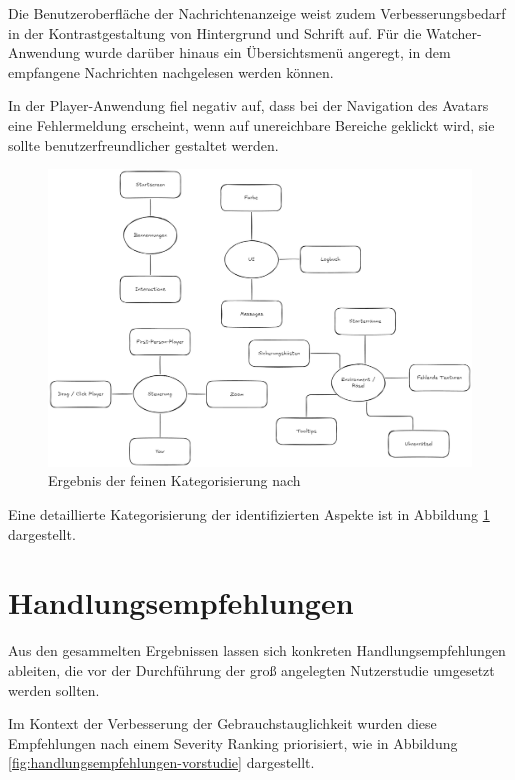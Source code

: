 Die Benutzeroberfläche der Nachrichtenanzeige weist zudem Verbesserungsbedarf in der Kontrastgestaltung von Hintergrund und Schrift auf. Für die Watcher-Anwendung wurde darüber hinaus ein Übersichtsmenü angeregt, in dem empfangene Nachrichten nachgelesen werden können.

In der Player-Anwendung fiel negativ auf, dass bei der Navigation des Avatars eine Fehlermeldung erscheint, wenn auf unereichbare Bereiche geklickt wird, sie sollte benutzerfreundlicher gestaltet werden.

\begin{figure}[ht]
\centering
\includegraphics[width=1\linewidth]{content/pictures/Prestudy-Qualitative-Auswertung-Schritt-2.png}
\caption{Ergebnis der feinen Kategorisierung nach \cite{braun_using_2006}}
\label{fig:pre-study-qualitative-findings_2}
\end{figure}

Eine detaillierte Kategorisierung der identifizierten Aspekte ist in Abbildung \ref{fig:pre-study-qualitative-findings_2} dargestellt.

\section{Handlungsempfehlungen}

Aus den gesammelten Ergebnissen lassen sich konkreten Handlungsempfehlungen ableiten, die vor der Durchführung der groß angelegten Nutzerstudie umgesetzt werden sollten.

Im Kontext der Verbesserung der Gebrauchstauglichkeit wurden diese Empfehlungen nach einem Severity Ranking priorisiert, wie in Abbildung \ref{fig:handlungsempfehlungen-vorstudie} dargestellt.

